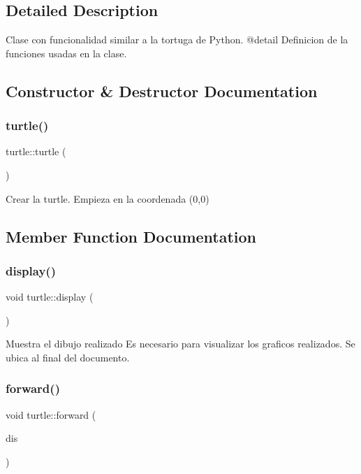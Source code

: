 \subsection{Detailed Description}
Clase con funcionalidad similar a la tortuga de Python. @detail Definicion de la funciones usadas en la clase. 

\subsection{Constructor \& Destructor Documentation}
\mbox{\label{classturtle_a38abda65e64c33bd48bdd6662bef1bf2}} 
\subsubsection{\texorpdfstring{turtle()}{turtle()}}
{\footnotesize\ttfamily turtle\+::turtle (\begin{DoxyParamCaption}{ }\end{DoxyParamCaption})}

Crear la turtle. Empieza en la coordenada (0,0) 

\subsection{Member Function Documentation}
\mbox{\label{classturtle_a43c0e14ffac82be79c6f10532765f13c}} 
\subsubsection{\texorpdfstring{display()}{display()}}
{\footnotesize\ttfamily void turtle\+::display (\begin{DoxyParamCaption}{ }\end{DoxyParamCaption})}

Muestra el dibujo realizado Es necesario para visualizar los graficos realizados. Se ubica al final del documento. \mbox{\label{classturtle_ad00882aa7ab7d41770d50e9112138fe1}} 
\subsubsection{\texorpdfstring{forward()}{forward()}}
{\footnotesize\ttfamily void turtle\+::forward (\begin{DoxyParamCaption}\item[{G\+Ldouble}]{dis }\end{DoxyParamCaption})}

